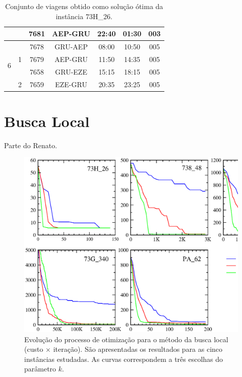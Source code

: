 \begin{table}[!htb]
\begin{center}
\begin{tabular}{|c|c|ccccc|}
			&	&	7681 & AEP-GRU & 22:40 & 01:30 & 003 \\ \hline \hline
			\multirow{4}{*}{6} & \multirow{3}{*}{1}  
				& 7678 & GRU-AEP & 08:00 & 10:50 & 005 \\
			& & 7679 & AEP-GRU & 11:50 & 14:35 & 005 \\
			&	& 7658 & GRU-EZE & 15:15 & 18:15 & 005 \\ \cline{2-7}
                           	 & \multirow{1}{*}{2}
				& 7659 & EZE-GRU & 20:35 & 23:25 & 005 \\ \hline
		\end{tabular}
		\caption{Conjunto de viagens obtido como solução ótima da instância 73H\_26.}
		\label{tab:pairings}
	\end{center}
\end{table}

			                               
\section{Busca Local}
\label{sec:resultados_busca}

Parte do Renato.

\begin{figure}[htbp]
	\begin{center}
		\includegraphics[scale=0.5]{fig/localsearch_results.eps}
		\caption{Evolução do processo de otimização para o método da busca local (custo $\times$ 
		iteração). São apresentadas os resultados para as cinco instâncias estudadas. As curvas 
		correspondem a três escolhas do parâmetro $k$.}
		\label{fig:ls_results}
	\end{center}
\end{figure}

